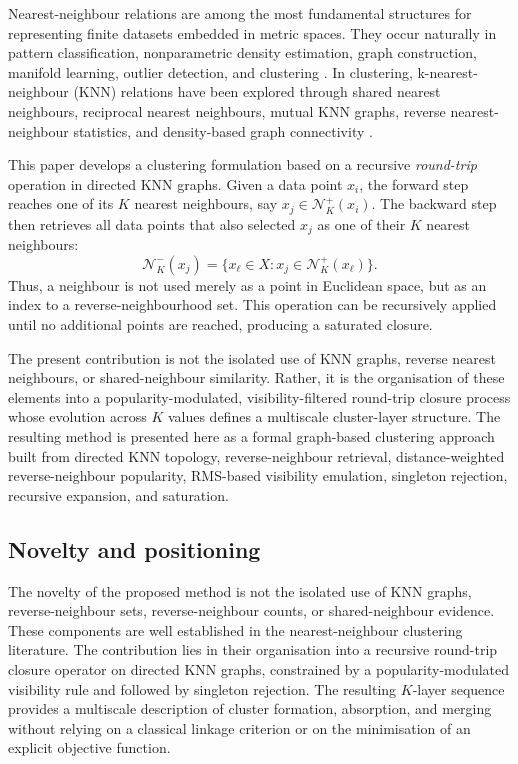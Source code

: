 \documentclass[pdflatex,sn-mathphys-num]{sn-jnl}
\newcommand{\calN}{\mathcal{N}}
\begin{document}
Nearest-neighbour relations are among the most fundamental structures for representing finite datasets embedded in metric spaces. They occur naturally in pattern classification, nonparametric density estimation, graph construction, manifold learning, outlier detection, and clustering \citep{CoverHart1967,LoftsgaardenQuesenberry1965,Bentley1975,FriedmanBentleyFinkel1977,VonLuxburg2007}. In clustering, k-nearest-neighbour (KNN) relations have been explored through shared nearest neighbours, reciprocal nearest neighbours, mutual KNN graphs, reverse nearest-neighbour statistics, and density-based graph connectivity \citep{JarvisPatrick1973,ErtozSteinbachKumar2003,BritoChavezQuirozYukich1997,GowdaKrishna1978,ChowdhuryAmorim2018,XieLeeWangChenZhou2019}.

This paper develops a clustering formulation based on a recursive \emph{round-trip} operation in directed KNN graphs. Given a data point $x_i$, the forward step reaches one of its $K$ nearest neighbours, say $x_j\in\calN_K^+(x_i)$. The backward step then retrieves all data points that also selected $x_j$ as one of their $K$ nearest neighbours:
\begin{equation}
\calN_K^-(x_j)=\{x_\ell\in X: x_j\in\calN_K^+(x_\ell)\}.
\end{equation}
Thus, a neighbour is not used merely as a point in Euclidean space, but as an index to a reverse-neighbourhood set. This operation can be recursively applied until no additional points are reached, producing a saturated closure.

The present contribution is not the isolated use of KNN graphs, reverse nearest neighbours, or shared-neighbour similarity. Rather, it is the organisation of these elements into a popularity-modulated, visibility-filtered round-trip closure process whose evolution across $K$ values defines a multiscale cluster-layer structure. The resulting method is presented here as a formal graph-based clustering approach built from directed KNN topology, reverse-neighbour retrieval, distance-weighted reverse-neighbour popularity, RMS-based visibility emulation, singleton rejection, recursive expansion, and saturation.

\subsection{Novelty and positioning}

The novelty of the proposed method is not the isolated use of KNN graphs, reverse-neighbour sets, reverse-neighbour counts, or shared-neighbour evidence. These components are well established in the nearest-neighbour clustering literature. The contribution lies in their organisation into a recursive round-trip closure operator on directed KNN graphs, constrained by a popularity-modulated visibility rule and followed by singleton rejection. The resulting $K$-layer sequence provides a multiscale description of cluster formation, absorption, and merging without relying on a classical linkage criterion or on the minimisation of an explicit objective function.
\end{document}
